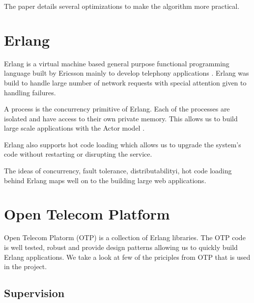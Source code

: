 The paper details several optimizations to make the algorithm more practical.

\section{Erlang}

Erlang \citep{erlang} is a virtual machine based general purpose functional
programming language built by Ericsson mainly to develop telephony applications
\citep{Armstrong07}. Erlang was build to handle large number of network
requests with special attention given to handling failures.

A process is the concurrency primitive of Erlang. Each of the processes are
isolated and have access to their own private memory. This allows us to build
large scale applications with the Actor model%
\citep{Clinger81}.

Erlang also supports hot code loading%
which allows us to upgrade the system's
code without restarting or disrupting the service.

The ideas of concurrency, fault tolerance, distributabilityi, hot code loading
behind Erlang maps well on to the building large web applications.



\section{Open Telecom Platform}
\label{section:concepts.otp}

Open Telecom Platorm (OTP) is a collection of Erlang libraries. The OTP code is
well tested, robust and provide design patterns allowing us to quickly build
Erlang applications. We take a look at few of the priciples from OTP that is
used in the project.

\subsection{Supervision}
\label{section:concepts.supervision}

